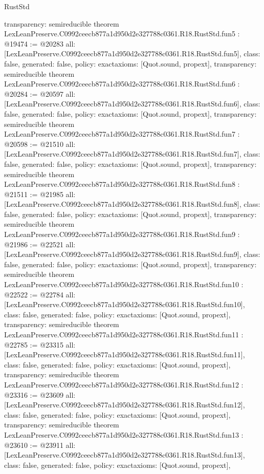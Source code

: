 \begin{lexlean}{RustStd}
\begin{coremodule}
{  transparency: semireducible
}
theorem LexLeanPreserve.C0992ceecb877a1d950d2e327788c0361.R18.RustStd.fun5 : @19474 := @20283 {
  all: [LexLeanPreserve.C0992ceecb877a1d950d2e327788c0361.R18.RustStd.fun5],
  class: false,
  generated: false,
  policy: exact{axioms: [Quot.sound, propext]},
  transparency: semireducible
}
theorem LexLeanPreserve.C0992ceecb877a1d950d2e327788c0361.R18.RustStd.fun6 : @20284 := @20597 {
  all: [LexLeanPreserve.C0992ceecb877a1d950d2e327788c0361.R18.RustStd.fun6],
  class: false,
  generated: false,
  policy: exact{axioms: [Quot.sound, propext]},
  transparency: semireducible
}
theorem LexLeanPreserve.C0992ceecb877a1d950d2e327788c0361.R18.RustStd.fun7 : @20598 := @21510 {
  all: [LexLeanPreserve.C0992ceecb877a1d950d2e327788c0361.R18.RustStd.fun7],
  class: false,
  generated: false,
  policy: exact{axioms: [Quot.sound, propext]},
  transparency: semireducible
}
theorem LexLeanPreserve.C0992ceecb877a1d950d2e327788c0361.R18.RustStd.fun8 : @21511 := @21985 {
  all: [LexLeanPreserve.C0992ceecb877a1d950d2e327788c0361.R18.RustStd.fun8],
  class: false,
  generated: false,
  policy: exact{axioms: [Quot.sound, propext]},
  transparency: semireducible
}
theorem LexLeanPreserve.C0992ceecb877a1d950d2e327788c0361.R18.RustStd.fun9 : @21986 := @22521 {
  all: [LexLeanPreserve.C0992ceecb877a1d950d2e327788c0361.R18.RustStd.fun9],
  class: false,
  generated: false,
  policy: exact{axioms: [Quot.sound, propext]},
  transparency: semireducible
}
theorem LexLeanPreserve.C0992ceecb877a1d950d2e327788c0361.R18.RustStd.fun10 : @22522 := @22784 {
  all: [LexLeanPreserve.C0992ceecb877a1d950d2e327788c0361.R18.RustStd.fun10],
  class: false,
  generated: false,
  policy: exact{axioms: [Quot.sound, propext]},
  transparency: semireducible
}
theorem LexLeanPreserve.C0992ceecb877a1d950d2e327788c0361.R18.RustStd.fun11 : @22785 := @23315 {
  all: [LexLeanPreserve.C0992ceecb877a1d950d2e327788c0361.R18.RustStd.fun11],
  class: false,
  generated: false,
  policy: exact{axioms: [Quot.sound, propext]},
  transparency: semireducible
}
theorem LexLeanPreserve.C0992ceecb877a1d950d2e327788c0361.R18.RustStd.fun12 : @23316 := @23609 {
  all: [LexLeanPreserve.C0992ceecb877a1d950d2e327788c0361.R18.RustStd.fun12],
  class: false,
  generated: false,
  policy: exact{axioms: [Quot.sound, propext]},
  transparency: semireducible
}
theorem LexLeanPreserve.C0992ceecb877a1d950d2e327788c0361.R18.RustStd.fun13 : @23610 := @23911 {
  all: [LexLeanPreserve.C0992ceecb877a1d950d2e327788c0361.R18.RustStd.fun13],
  class: false,
  generated: false,
  policy: exact{axioms: [Quot.sound, propext]},
}
\end{coremodule}
\end{lexlean}
